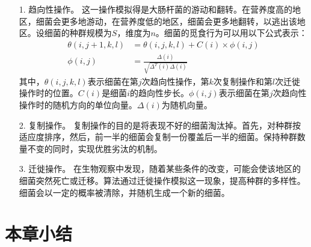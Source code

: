   \begin{enumerate}
    \item[1.] 趋向性操作。 
    这一操作模拟得是大肠杆菌的游动和翻转。在营养度高的地区，细菌会更多地游动，在营养度低的地区，细菌会更多地翻转，以逃出该地区。设细菌的种群规模为$S$，维度为$n$。细菌的觅食行为可以用以下公式表示：
    \begin{align}
      \theta(i,j+1,k,l) &= \theta(i,j,k,l) + C(i) \times \phi(i,j) \\
      \phi(i,j) &= \frac{\Delta(i)}{\sqrt{\Delta^T(i)\Delta(i)}}
    \end{align}
    其中，$\theta(i,j,k,l)$表示细菌在第$j$次趋向性操作，第$k$次复制操作和第$l$次迁徙操作时的位置。$C(i)$是细菌$i$的趋向性步长。$\phi(i,j)$表示细菌在第$j$次趋向性操作时的随机方向的单位向量。$\Delta(i)$为随机向量。

    \item[2.] 复制操作。
    复制操作的目的是将表现不好的细菌淘汰掉。首先，对种群按适应度排序，然后，前一半的细菌会复制一份覆盖后一半的细菌。保持种群数量不变的同时，实现优胜劣汰的机制。

    \item[3.] 迁徙操作。
    在生物观察中发现，随着某些条件的改变，可能会使该地区的细菌突然死亡或迁移。算法通过迁徙操作模拟这一现象，提高种群的多样性。细菌会以一定的概率被清除，并随机生成一个新的细菌。
    
  \end{enumerate}

\section{本章小结}